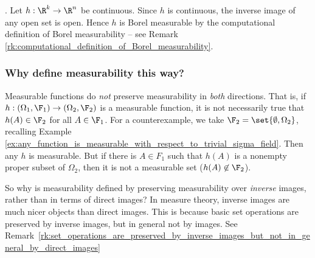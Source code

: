 \documentclass{article} %
\begin{document}
\begin{example}{}. Let $h : \R^k \to \R^n$ be continuous.  Since $h$ is continuous, the inverse image of any open set is open. Hence $h$ is Borel measurable by the computational definition of Borel measurability -- see Remark \ref{rk:computational_definition_of_Borel_measurability}.
\end{example}

\subsubsection{Why define measurability this way?} \label{sec:why_define_measurability_this_way}

Measurable functions do \textit{not} preserve measurability in \textit{both} directions. That is, if $h : (\Omega_1, \F_1) \to (\Omega_2, \F_2)$ is a measurable function, it is not necessarily true that $h(A) \in \F_2$ for all $A \in \F_1$.  For a counterexample, we take $\F_2 = \set{\emptyset, \Omega_2}$, recalling Example \ref{ex:any_function_is_measurable_with_respect_to_trivial_sigma_field}.   Then any $h$ is measurable.  But if there is $A \in F_1$ such that $h(A)$ is a nonempty proper subset of $\Omega_2$, then it is not a measurable set ($h(A) \not\in \F_2$). 

So why is measurability defined by preserving measurability over \textit{inverse} images, rather than in terms of direct images?  In measure theory, inverse images are much nicer objects than direct images.  This is because basic set operations are preserved by inverse images, but in general not by images.   See Remark~\ref{rk:set_operations_are_preserved_by_inverse_images_but_not_in_general_by_direct_images}
\end{document}
